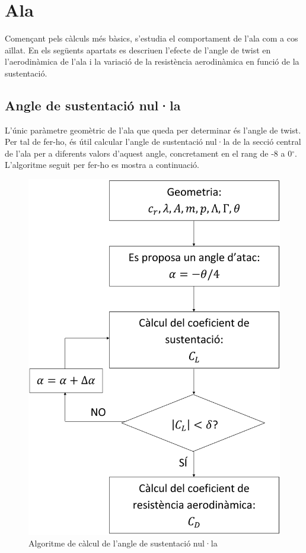 \chapter{Ala}
Començant pels càlculs més bàsics, s'estudia el comportament de l'ala com a cos aïllat. En els següents apartats es descriuen l'efecte de l'angle de twist en l'aerodinàmica de l'ala i la variació de la resistència aerodinàmica en funció de la sustentació.

\section{Angle de sustentació nul·la}
L'únic paràmetre geomètric de l'ala que queda per determinar és l'angle de twist. Per tal de fer-ho, és útil calcular l'angle de sustentació nul·la de la secció central de l'ala per a diferents valors d'aquest angle, concretament en el rang de -8 a 0$^{\circ}$. L'algoritme seguit per fer-ho es mostra a continuació.
\begin{figure}[H]
	\centering
	\includegraphics[scale=0.1]{./plots/algoritmeZLangle}
	\caption{Algoritme de càlcul de l'angle de sustentació nul·la}
\end{figure}


